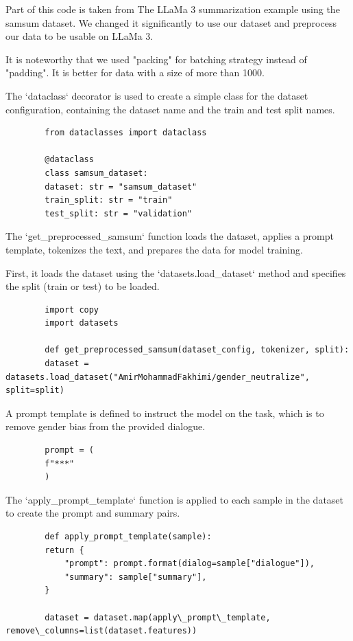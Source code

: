 \documentclass{solutionclass} %
\begin{document}
Part of this code is taken from The LLaMa 3 summarization example using the samsum dataset. We changed it significantly to use our dataset and preprocess our data to be usable on LLaMa 3.

It is noteworthy that we used "packing" for batching strategy instead of "padding". It is better for data with a size of more than 1000.



\begin{solution}
	The `dataclass` decorator is used to create a simple class for the dataset configuration, containing the dataset name and the train and test split names.
	\begin{lstlisting}
		from dataclasses import dataclass
		
		@dataclass
		class samsum_dataset:
		dataset: str = "samsum_dataset"
		train_split: str = "train"
		test_split: str = "validation"
	\end{lstlisting}
\end{solution}

\begin{solution}
	The `get\_preprocessed\_samsum` function loads the dataset, applies a prompt template, tokenizes the text, and prepares the data for model training. 
	
	First, it loads the dataset using the `datasets.load\_dataset` method and specifies the split (train or test) to be loaded.
	\begin{lstlisting}
		import copy
		import datasets
		
		def get_preprocessed_samsum(dataset_config, tokenizer, split):
		dataset = datasets.load_dataset("AmirMohammadFakhimi/gender_neutralize", split=split)
	\end{lstlisting}
\end{solution}

\begin{solution}
	A prompt template is defined to instruct the model on the task, which is to remove gender bias from the provided dialogue.
	\begin{lstlisting}
		prompt = (
		f"***"
		)
	\end{lstlisting}
\end{solution}

\begin{solution}
	The `apply\_prompt\_template` function is applied to each sample in the dataset to create the prompt and summary pairs.
	\begin{lstlisting}
		def apply_prompt_template(sample):
		return {
			"prompt": prompt.format(dialog=sample["dialogue"]),
			"summary": sample["summary"],
		}
		
		dataset = dataset.map(apply\_prompt\_template, remove\_columns=list(dataset.features))
	\end{lstlisting}
\end{solution}
\end{document}
